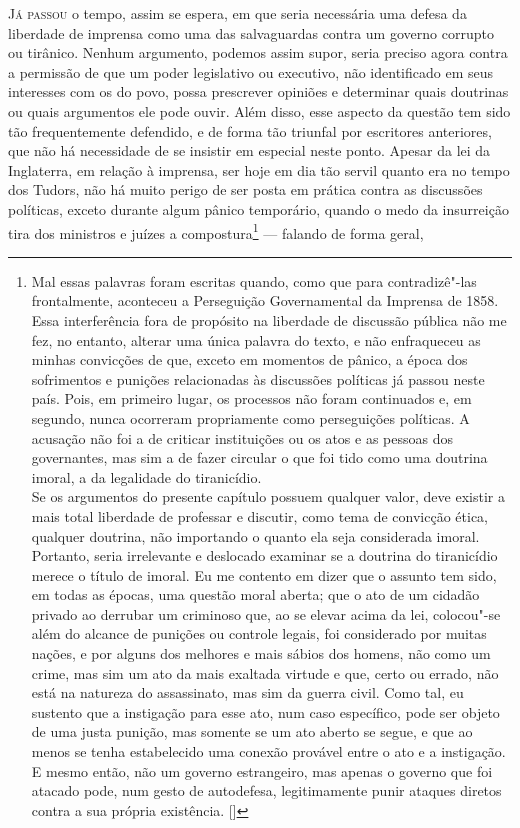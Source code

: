 \textsc{Já passou} o tempo, assim se espera, em que seria 
necessária uma defesa da liberdade de imprensa como uma das
salvaguardas contra um governo corrupto ou tirânico. Nenhum argumento,
podemos assim supor, seria preciso agora contra a permissão de que um
poder legislativo ou executivo, não identificado em seus interesses com
os do povo, possa prescrever opiniões e determinar quais
doutrinas ou quais argumentos ele pode ouvir. Além disso, esse aspecto
da questão tem sido tão frequentemente defendido, e de forma tão triunfal 
por escritores anteriores, que não há necessidade de se
insistir em especial neste ponto. Apesar da lei da Inglaterra, 
em relação à imprensa, ser hoje em dia tão servil quanto era no
tempo dos Tudors, não há muito perigo de ser posta em prática contra
as discussões políticas, exceto durante algum pânico temporário, quando
o medo da insurreição tira dos ministros e juízes a
compostura\footnote{ Mal essas palavras foram escritas quando, 
como que para contradizê"-las frontalmente, aconteceu a Perseguição 
Governamental da Imprensa de 1858. Essa interferência 
fora de propósito na liberdade de discussão
pública não me fez, no entanto, alterar uma única palavra do texto, e
não enfraqueceu as minhas convicções de que, exceto em momentos de pânico,
a época dos sofrimentos e punições relacionadas às discussões políticas
já passou neste país. Pois, em primeiro lugar, os processos não foram
continuados e, em segundo, nunca ocorreram propriamente como
perseguições políticas. A acusação não foi a de criticar instituições
ou os atos e as pessoas dos governantes, mas sim a de fazer circular o
que foi tido como uma doutrina imoral, a da legalidade do
tiranicídio.\\ Se os argumentos do presente capítulo possuem qualquer
valor, deve existir a mais total liberdade de professar e discutir,
como tema de convicção ética, qualquer doutrina, não importando o
quanto ela seja considerada imoral. Portanto, seria irrelevante e
deslocado examinar se a doutrina do tiranicídio merece o título de
imoral. Eu me contento em dizer que o assunto tem sido, em todas as
épocas, uma questão moral aberta; que o ato de um cidadão privado ao
derrubar um criminoso que, ao se elevar acima da lei, colocou"-se além
do alcance de punições ou controle legais, foi considerado por muitas
nações, e por alguns dos melhores e mais sábios dos homens, não como
um crime, mas sim um ato da mais exaltada virtude e que, certo ou
errado, não está na natureza do assassinato, mas sim da guerra civil.
Como tal, eu sustento que a instigação para esse ato, num caso
específico, pode ser objeto de uma justa punição, mas somente se um ato
aberto se segue, e que ao menos se tenha estabelecido uma conexão
provável entre o ato e a instigação. E mesmo então, não um governo
estrangeiro, mas apenas o governo que foi atacado pode, num gesto de
autodefesa, legitimamente punir ataques diretos contra a sua própria
existência. \mbox{[]}} --- falando de forma geral, 
